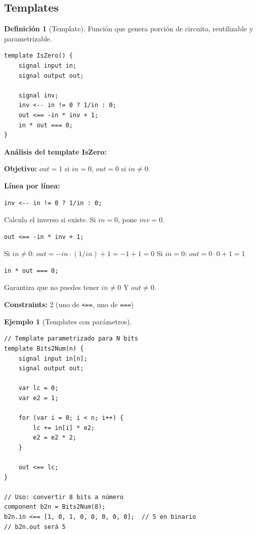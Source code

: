 \documentclass[11pt,a4paper,twoside,openright]{book}
\theoremstyle{definition}
\newtheorem{definition}{Definición}[chapter]
\newtheorem{example}{Ejemplo}[chapter]
\theoremstyle{plain}
\theoremstyle{remark}
\begin{document}
\subsection{Templates}

\begin{definition}[Template]
Función que genera porción de circuito, reutilizable y parametrizable.
\end{definition}

\begin{verbatim}
template IsZero() {
    signal input in;
    signal output out;
    
    signal inv;
    inv <-- in != 0 ? 1/in : 0;
    out <== -in * inv + 1;
    in * out === 0;
}
\end{verbatim}

\begin{mathnote}
\textbf{Análisis del template IsZero:}

\textbf{Objetivo:} $out = 1$ si $in = 0$, $out = 0$ si $in \neq 0$.

\textbf{Línea por línea:}
\begin{verbatim}
inv <-- in != 0 ? 1/in : 0;
\end{verbatim}
Calcula el inverso si existe. Si $in = 0$, pone $inv = 0$.

\begin{verbatim}
out <== -in * inv + 1;
\end{verbatim}
Si $in \neq 0$: $out = -in \cdot (1/in) + 1 = -1 + 1 = 0$
Si $in = 0$: $out = 0 \cdot 0 + 1 = 1$

\begin{verbatim}
in * out === 0;
\end{verbatim}
Garantiza que no puedes tener $in \neq 0$ Y $out \neq 0$.

\textbf{Constraints:} 2 (uno de \texttt{<==}, uno de \texttt{===})
\end{mathnote}

\begin{example}[Templates con parámetros]
\begin{verbatim}
// Template parametrizado para N bits
template Bits2Num(n) {
    signal input in[n];
    signal output out;
    
    var lc = 0;
    var e2 = 1;
    
    for (var i = 0; i < n; i++) {
        lc += in[i] * e2;
        e2 = e2 * 2;
    }
    
    out <== lc;
}

// Uso: convertir 8 bits a número
component b2n = Bits2Num(8);
b2n.in <== [1, 0, 1, 0, 0, 0, 0, 0];  // 5 en binario
// b2n.out será 5
\end{verbatim}
\end{example}
\end{document}
